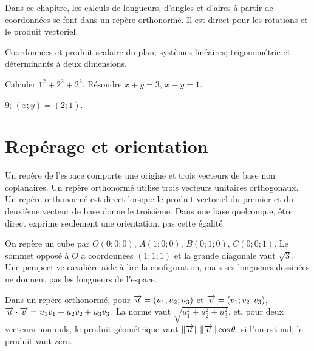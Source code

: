 \label{t11s-c17}
Dans ce chapitre, les calculs de longueurs, d’angles et d’aires à partir de coordonnées se font dans un repère orthonormé. Il est direct pour les rotations et le produit vectoriel.
\begin{revision}Coordonnées et produit scalaire du plan; systèmes linéaires; trigonométrie et déterminants à deux dimensions.\end{revision}
\begin{automatismes}\exo\label{t11s-c17-auto}Calculer $1^2+2^2+2^2$. Résoudre $x+y=3$, $x-y=1$.\end{automatismes}
\begin{corrige}\label{sol-t11s-c17-auto}$9$; $(x;y)=(2;1)$.\end{corrige}

\section{Repérage et orientation}
\begin{definition}Un repère de l’espace comporte une origine et trois vecteurs de base non coplanaires. Un repère orthonormé utilise trois vecteurs unitaires orthogonaux. Un repère orthonormé est direct lorsque le produit vectoriel du premier et du deuxième vecteur de base donne le troisième. Dans une base quelconque, être direct exprime seulement une orientation, pas cette égalité.\end{definition}
\begin{exemple}On repère un cube par $O(0;0;0)$, $A(1;0;0)$, $B(0;1;0)$, $C(0;0;1)$. Le sommet opposé à $O$ a coordonnées $(1;1;1)$ et la grande diagonale vaut $\sqrt3$. Une perspective cavalière aide à lire la configuration, mais ses longueurs dessinées ne donnent pas les longueurs de l’espace.\end{exemple}
\begin{propriete}Dans un repère orthonormé, pour $\overrightarrow{u}=(u_1;u_2;u_3)$ et $\overrightarrow{v}=(v_1;v_2;v_3)$, $\overrightarrow{u}\cdot\overrightarrow{v}=u_1v_1+u_2v_2+u_3v_3$. La norme vaut $\sqrt{u_1^2+u_2^2+u_3^2}$, et, pour deux vecteurs non nuls, le produit géométrique vaut $\left\lVert \overrightarrow{u} \right\rVert\left\lVert \overrightarrow{v} \right\rVert\cos\theta$; si l’un est nul, le produit vaut zéro.\end{propriete}
